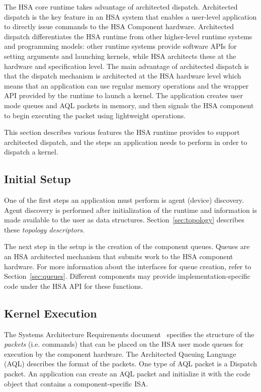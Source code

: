 \documentclass[final]{book}
\begin{document}
The HSA core runtime takes advantage of architected dispatch. Architected
dispatch is the key feature in an HSA system that enables a user-level
application to directly issue commands to the HSA Component hardware.
Architected dispatch differentiates the HSA runtime from other higher-level
runtime systems and programming models: other runtime systems provide
software APIs for setting arguments and launching kernels, while HSA architects
these at the hardware and specification level. The main advantage of architected
dispatch is that the dispatch mechanism is architected at the HSA hardware level
which means that an application can use regular memory operations and the
wrapper API provided by the runtime to launch a kernel. The application creates
user mode queues and AQL packets in memory, and then signals the HSA component
to begin executing the packet using lightweight operations.

This section describes various features the HSA runtime provides to support
architected dispatch, and the steps an application needs to perform in order to
dispatch a kernel.

\subsection{Initial Setup}
One of the first steps an application must perform is agent (device) discovery.
Agent discovery is performed after initialization of the runtime and information is
made available to the user as data structures. Section~\ref{sec:topology}
describes these \textit{topology descriptors}.

The next step in the setup is the creation of the component queues. Queues are an
HSA architected mechanism that submits work to the HSA component hardware. For
more information about the interfaces for queue creation, refer to
Section~\ref{sec:queues}. Different components may provide
implementation-specific code under the HSA API for these functions.


\subsection{Kernel Execution}
The Systems Architecture Requirements document~\cite{sar} specifies the
structure of the \emph{packets} (i.e. commands) that can be placed on the HSA
user mode queues for execution by the component hardware. The Architected
Queuing Language (AQL) describes the format of the packets. One type of
AQL packet is a Dispatch packet. An application can create an AQL packet
and initialize it with the code object that contains a component-specific ISA.
\end{document}
